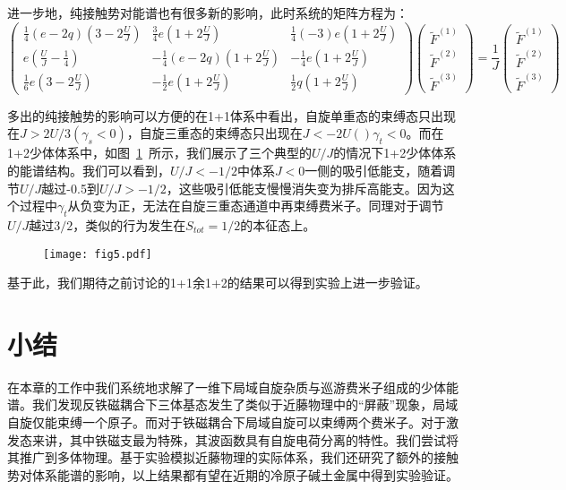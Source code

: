 进一步地，纯接触势对能谱也有很多新的影响，此时系统的矩阵方程为：
\begin{equation}
\left(\begin{array}{ccc}
\frac{1}{4}(e-2 q)\left(3-2 \frac{U}{J}\right) & \frac{3}{4} e\left(1+2 \frac{U}{J}\right) & \frac{1}{4}(-3) e\left(1+2 \frac{U}{J}\right) \\
e\left(\frac{U}{J}-\frac{1}{4}\right) & -\frac{1}{4}(e-2 q)\left(1+2 \frac{U}{J}\right) & -\frac{1}{4} e\left(1+2 \frac{U}{J}\right) \\
\frac{1}{6} e\left(3-2 \frac{U}{J}\right) & -\frac{1}{2} e\left(1+2 \frac{U}{J}\right) & \frac{1}{2} q\left(1+2 \frac{U}{J}\right)
\end{array}\right)\left(\begin{array}{l}
\tilde{F}^{(1)} \\
\tilde{F}^{(2)} \\
\tilde{F}^{(3)}
\end{array}\right)=\frac{1}{J}\left(\begin{array}{l}
\tilde{F}^{(1)} \\
\tilde{F}^{(2)} \\
\tilde{F}^{(3)}
\end{array}\right)
\end{equation}

多出的纯接触势的影响可以方便的在1+1体系中看出，自旋单重态的束缚态只出现在$J>2U/3(\gamma_s<0)$，自旋三重态的束缚态只出现在$J<-2U()\gamma_t<0$。而在1+2少体体系中，如图~\ref{fig5}~所示，我们展示了三个典型的$U/J$的情况下1+2少体体系的能谱结构。我们可以看到，$U/J<-1/2$中体系$J<0$一侧的吸引低能支，随着调节$U/J$越过-0.5到$U/J>-1/2$，这些吸引低能支慢慢消失变为排斥高能支。因为这个过程中$\gamma_t$从负变为正，无法在自旋三重态通道中再束缚费米子。同理对于调节$U/J$越过$3/2$，类似的行为发生在$S_{tot}=1/2$的本征态上。


\begin{figure}[!htbp]
    \centering
    \texttt{[image: fig5.pdf]}
    \label{fig5}
\end{figure}

基于此，我们期待之前讨论的1+1余1+2的结果可以得到实验上进一步验证。

\section{小结}\label{2sec:spex-summary}
在本章的工作中我们系统地求解了一维下局域自旋杂质与巡游费米子组成的少体能谱。我们发现反铁磁耦合下三体基态发生了类似于近藤物理中的“屏蔽”现象，局域自旋仅能束缚一个原子。而对于铁磁耦合下局域自旋可以束缚两个费米子。对于激发态来讲，其中铁磁支最为特殊，其波函数具有自旋电荷分离的特性。我们尝试将其推广到多体物理。基于实验模拟近藤物理的实际体系，我们还研究了额外的接触势对体系能谱的影响，以上结果都有望在近期的冷原子碱土金属中得到实验验证。
